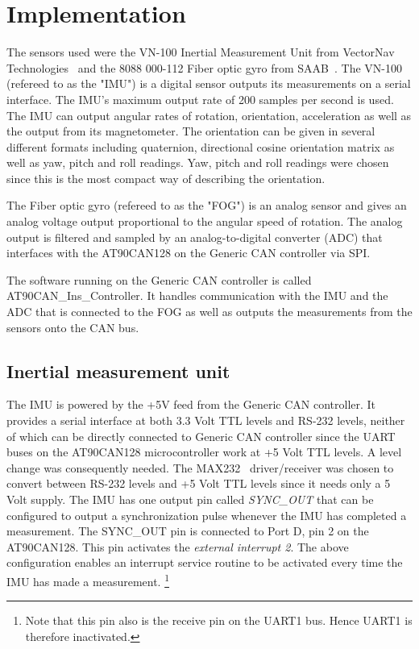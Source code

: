 
\section{Implementation}\label{sec:implementation}
The sensors used were the VN-100 Inertial Measurement Unit from VectorNav Technologies~\cite{web:vn100} and the 8088 000-112 Fiber optic gyro from SAAB~\cite{web:fog1}. The VN-100 (refereed to as the "IMU") is a digital sensor outputs its measurements on a serial interface. The IMU's  maximum output rate of 200 samples per second is used. The IMU can output angular rates of rotation, orientation, acceleration as well as the output from its magnetometer. The orientation can be given in several different formats including quaternion, directional cosine orientation matrix as well as yaw, pitch and roll readings. Yaw, pitch and roll readings were chosen since this is the most compact way of describing the orientation.

The Fiber optic gyro (refereed to as the "FOG") is an analog sensor and gives an analog voltage output proportional to the angular speed of rotation. The analog output is filtered and sampled by an analog-to-digital converter (ADC) that interfaces with the AT90CAN128 on the Generic CAN controller via SPI.

The software running on the Generic CAN controller is called AT90CAN\_Ins\_Controller. It handles communication with the IMU and the ADC that is connected to the FOG as well as outputs the measurements from the sensors onto the CAN bus.

\subsection{Inertial measurement unit}
The IMU is powered by the +5V feed from the Generic CAN controller. It provides a serial interface at both 3.3 Volt TTL levels and RS-232 levels, neither of which can be directly connected to Generic CAN controller since the UART buses on the AT90CAN128 microcontroller work at +5 Volt TTL levels. A level change was consequently needed. The MAX232~\cite{web:max232} driver/receiver was chosen to convert between RS-232 levels and +5 Volt TTL levels since it needs only a 5 Volt supply. \newline
The IMU has one output pin called \emph{SYNC\_OUT} that can be configured to output a synchronization pulse whenever the IMU has completed a measurement. The SYNC\_OUT pin is connected to Port D, pin 2 on the AT90CAN128. This pin activates the \emph{external interrupt 2}. \newline
The above configuration enables an interrupt service routine to be activated every time the IMU has made a measurement.\newline 
\footnote{Note that this pin also is the receive pin on the UART1 bus. Hence UART1 is therefore inactivated.} 

